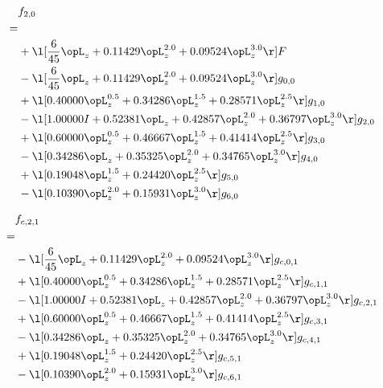 \begin{alignat}{2} 
\label{eq:f_20_0} 
& f_{2,0} \nonumber \\ 
 = \\ 
& + \l[ \frac{6}{45} \opL_z +  0.11429 \opL_z^{2.0} +  0.09524 \opL_z^{3.0}  \r] F \nonumber \\ 
& - \l[ \frac{6}{45} \opL_z +  0.11429 \opL_z^{2.0} +  0.09524 \opL_z^{3.0}  \r] g_{0,0} \nonumber \\ 
& + \l[  0.40000 \opL_z^{0.5} +  0.34286 \opL_z^{1.5} +  0.28571 \opL_z^{2.5}  \r] g_{1,0} \nonumber \\ 
& - \l[  1.00000 I +  0.52381 \opL_z +  0.42857 \opL_z^{2.0} +  0.36797 \opL_z^{3.0}  \r] g_{2,0} \nonumber \\ 
& + \l[  0.60000 \opL_z^{0.5} +  0.46667 \opL_z^{1.5} +  0.41414 \opL_z^{2.5}  \r] g_{3,0} \nonumber \\ 
& - \l[  0.34286 \opL_z +  0.35325 \opL_z^{2.0} +  0.34765 \opL_z^{3.0}  \r] g_{4,0} \nonumber \\ 
& + \l[  0.19048 \opL_z^{1.5} +  0.24420 \opL_z^{2.5}  \r] g_{5,0} \nonumber \\ 
& - \l[  0.10390 \opL_z^{2.0} +  0.15931 \opL_z^{3.0}  \r] g_{6,0} \nonumber \\ 
\end{alignat} 


\begin{alignat}{2} 
\label{eq:f_21_0} 
& f_{c,2,1} \nonumber \\ 
 = \\ 
& - \l[ \frac{6}{45} \opL_z +  0.11429 \opL_z^{2.0} +  0.09524 \opL_z^{3.0}  \r] g_{c,0,1} \nonumber \\ 
& + \l[  0.40000 \opL_z^{0.5} +  0.34286 \opL_z^{1.5} +  0.28571 \opL_z^{2.5}  \r] g_{c,1,1} \nonumber \\ 
& - \l[  1.00000 I +  0.52381 \opL_z +  0.42857 \opL_z^{2.0} +  0.36797 \opL_z^{3.0}  \r] g_{c,2,1} \nonumber \\ 
& + \l[  0.60000 \opL_z^{0.5} +  0.46667 \opL_z^{1.5} +  0.41414 \opL_z^{2.5}  \r] g_{c,3,1} \nonumber \\ 
& - \l[  0.34286 \opL_z +  0.35325 \opL_z^{2.0} +  0.34765 \opL_z^{3.0}  \r] g_{c,4,1} \nonumber \\ 
& + \l[  0.19048 \opL_z^{1.5} +  0.24420 \opL_z^{2.5}  \r] g_{c,5,1} \nonumber \\ 
& - \l[  0.10390 \opL_z^{2.0} +  0.15931 \opL_z^{3.0}  \r] g_{c,6,1} \nonumber \\ 
\end{alignat} 


